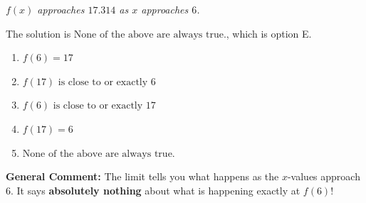 \documentclass{extbook}[14pt]
\begin{document}
\begin{enumerate}
{\begin{center}
    \textit{ $f(x)$ approaches $17.314$ as $x$ approaches $6$. }
\end{center}
The solution is \( \text{None of the above are always true.} \), which is option E.\begin{enumerate}[label=\Alph*.]
\item \( f(6) = 17 \)


\item \( f(17) \text{ is close to or exactly } 6 \)


\item \( f(6) \text{ is close to or exactly } 17 \)


\item \( f(17) = 6 \)


\item \( \text{None of the above are always true.} \)


\end{enumerate}

\textbf{General Comment:} The limit tells you what happens as the $x$-values approach $6$. It says \textbf{absolutely nothing} about what is happening exactly at $f(6)$!
}
\end{enumerate}
\end{document}
